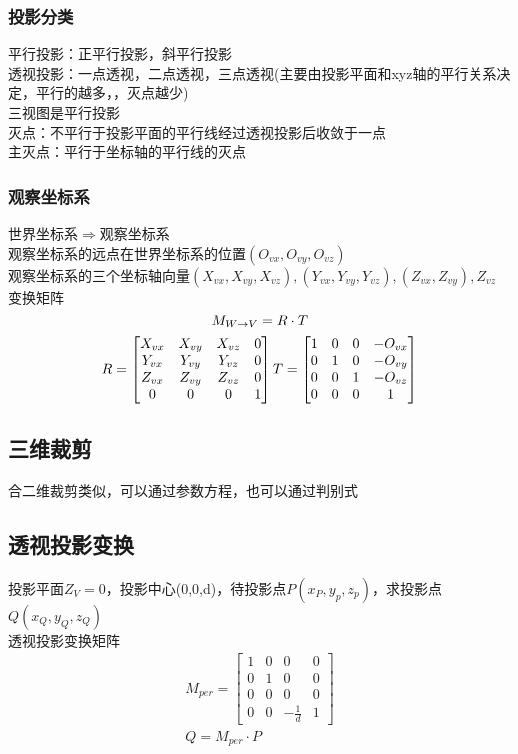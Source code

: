 \documentclass{article}
\begin{document}
\begin{CJK}{UTF8}{gbsn}
	\subsubsection{投影分类}
	平行投影：正平行投影，斜平行投影\\
	透视投影：一点透视，二点透视，三点透视(主要由投影平面和xyz轴的平行关系决定，平行的越多，，灭点越少)\\
	三视图是平行投影\\
	灭点：不平行于投影平面的平行线经过透视投影后收敛于一点\\
	主灭点：平行于坐标轴的平行线的灭点\\
	\subsubsection{观察坐标系}
	世界坐标系$\Rightarrow$观察坐标系\\
	观察坐标系的远点在世界坐标系的位置$(O_{vx},O_{vy},O_{vz})$\\
	观察坐标系的三个坐标轴向量$(X_{vx},X_{vy},X_{vz}),(Y_{vx},Y_{vy},Y_{vz}),(Z_{vx},Z_{vy}),Z_{vz}$\\
	变换矩阵\\
	$$
	M_{W\rightarrow V}=R\cdot T\\
	$$
	$$
	R = \begin{bmatrix}
	X_{vx}&X_{vy}&X_{vz}&0\\
	Y_{vx}&Y_{vy}&Y_{vz}&0\\
	Z_{vx}&Z_{vy}&Z_{vz}&0\\
	0&0&0&1
	\end{bmatrix}\\
	T=\begin{bmatrix}
	1&0&0&-O_{vx}\\
	0&1&0&-O_{vy}\\
	0&0&1&-O_{vz}\\
	0&0&0&1
	\end{bmatrix}
	$$
	\subsection{三维裁剪}
	合二维裁剪类似，可以通过参数方程，也可以通过判别式\\
	\subsection{透视投影变换}
	投影平面$Z_V=0$，投影中心(0,0,d)，待投影点$P(x_P,y_p,z_p)$，求投影点$Q(x_Q,y_Q,z_Q)$\\
	透视投影变换矩阵\\
	\begin{equation*}
	\begin{split}	
	M_{per}=\begin{bmatrix}
	1&0&0&0\\
	0&1&0&0\\
	0&0&0&0\\
	0&0&-\frac{1}{d}&1
	\end{bmatrix}\\
	Q=M_{per}\cdot P\\
	\end{split}
	\end{equation*}
	

\end{CJK}
\end{document}
